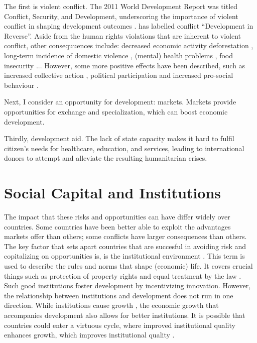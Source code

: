 The first is violent conflict. The 2011 World Development Report was titled Conflict, Security, and Development, underscoring the importance of violent conflict in shaping development outcomes \cite{WorldBank2011}. \citet{Collier2003} has labelled conflict ``Development in Reverse''. Aside from the human rights violations that are inherent to violent conflict, other consequuences include: decreased economic activity \citep{Collier1999} deforestation \cite[e.g.][]{Connectiona}, long-term incidence of domestic violence \citep[e.g.][]{LaMattina2017; Muller2019}, (mental) health problems \cite[e.g.][]{Smith2002; Iqbal2006a;Akresh2011}, food insecurity \cite[e.g.][]{Lecoutere2005; Verwimp2012}... However, some more positive effects have been described, such as increased collective action \citep{Bellows2009b}, political participation \citep{Blattman2009a} and increased pro-social behaviour \citep{Voors2012a}.

Next, I consider an opportunity for development: markets. Markets provide opportunities for exchange and specialization, which can boost economic development. 

Thirdly,  development aid. The lack of state capacity makes it hard to fulfil citizen's needs for healthcare, education, and services, leading to international donors to attempt and alleviate the resulting humanitarian crises.

\section{Social Capital and Institutions}
The impact that these risks and opportunities can have differ widely over countries. Some countries have been better able to exploit the advantages markets offer than others; some conflicts have larger consequences than others. The key factor that sets apart countries that are succesful in avoiding risk and copitalizing on opportunities is, is the institutional environment \citep{Rodrik2004,Acemoglu2000}. This term is used to describe the rules and norms that shape (economic) life. It covers crucial things such as protection of property rights and equal treatment by the law \citep{Acemoglu2005}. Such good institutions  foster development by incentivizing innovation. However, the relationship between institutions and development does not run in one direction. While institutions cause growth \citep{Acemoglu2000}, the economic growth that accompanies development also allows for better institutions. It is possible that countries could enter a virtuous cycle, where improved institutional quality enhances growth, which improves institutional quality \citep{Voors2011}.


